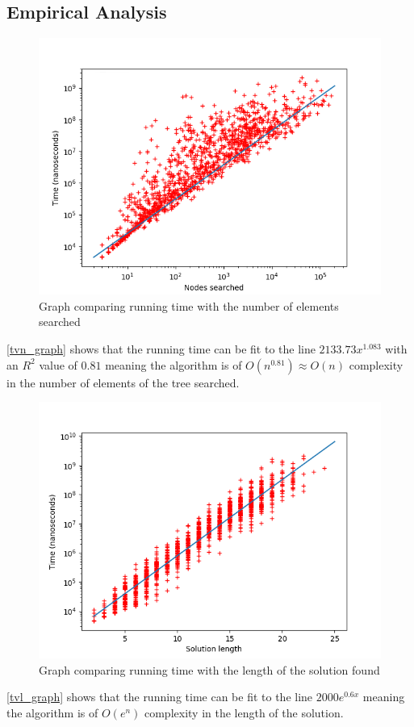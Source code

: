 \documentclass[12pt,a4paper]{report}
\begin{document}
\subsection*{Empirical Analysis}
\graphicspath{ {TestData/} }
\begin{figure}[h]
  \includegraphics[width=\linewidth]{time_vs_nodes}
  \caption{Graph comparing running time with the number of elements searched}
  \label{tvn_graph}
\end{figure}
\autoref{tvn_graph} shows that the running time can be fit to the line $2133.73x^{1.083}$ with an $R^2$ value of $0.81$ meaning the algorithm is of $O(n^{0.81}) \approx O(n)$ complexity in the number of elements of the tree searched.

\begin{figure}[h]
	\includegraphics[width=\linewidth]{time_vs_length}
	\caption{Graph comparing running time with the length of the solution found}
	\label{tvl_graph}
\end{figure}

\autoref{tvl_graph} shows that the running time can be fit to the line $2000 e^{0.6x}$ meaning the algorithm is of $O(e^n)$ complexity in the length of the solution.
\end{document}
